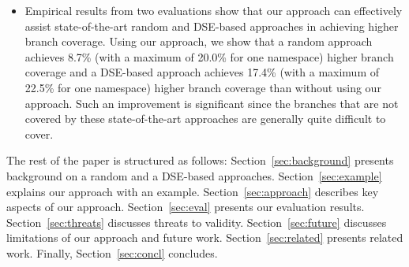 \begin{itemize}
\item Empirical results from two evaluations show that our approach can effectively assist state-of-the-art random and DSE-based approaches in achieving higher branch coverage. Using our approach, we show that a random approach achieves 8.7\% (with a maximum of 20.0\% for one namespace) higher branch coverage and a DSE-based approach achieves 17.4\% (with a maximum of 22.5\% for one namespace) higher branch coverage than without using our approach. Such an improvement is significant since the branches that are not covered by these state-of-the-art approaches are generally quite difficult to cover.
\end{itemize}

The rest of the paper is structured as follows:
Section~\ref{sec:background} presents background on a random and a DSE-based approaches.
Section~\ref{sec:example} explains our approach with an example.
Section~\ref{sec:approach} describes key aspects of our approach.
Section~\ref{sec:eval} presents our evaluation results.
Section~\ref{sec:threats} discusses threats to validity.
Section~\ref{sec:future} discusses limitations of our approach and future work.
Section~\ref{sec:related} presents related work.
Finally, Section~\ref{sec:concl} concludes. 

